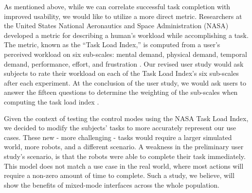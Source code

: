 As mentioned above, while we can correlate successful task completion with improved usability, we would like to utilize a more direct metric. Researchers at the United States National Aeronautics and Space Administration (NASA) developed a metric for describing a human's workload while accomplishing a task. The metric, known as the ``Task Load Index,'' is computed from a user's perceived workload on six sub-scales: mental demand, physical demand, temporal demand, performance, effort, and frustration \cite{NASA_TLX}. Our revised user study would ask subjects to rate their workload on each of the Task Load Index's six sub-scales after each experiment. At the conclusion of the user study, we would ask users to answer the fifteen questions to determine the weighting of the sub-scales when computing the task load index \cite{NASA_TLX20}.

Given the context of testing the control modes using the NASA Task Load Index, we decided to modify the subjects' tasks to more accurately represent our use cases. These new - more challenging - tasks would require a larger simulated world, more robots, and a different scenario. A weakness in the preliminary user study's scenario, is that the robots were able to complete their task immediately. This model does not match a use case in the real world, where most actions will require a non-zero amount of time to complete. Such a study, we believe, will show the benefits of mixed-mode interfaces across the whole population.
